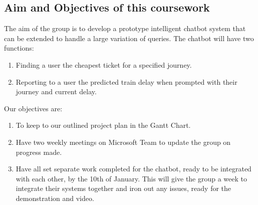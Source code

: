 \documentclass[11pt]{article}
\begin{document}
	\subsection{Aim and Objectives of this coursework} 
	The aim of the group is to develop a prototype intelligent chatbot system that can be extended to handle a large variation of queries. The chatbot will have two functions:
	\begin{enumerate}
		\item Finding a user the cheapest ticket for a specified journey.
		\item 	Reporting to a user the predicted train delay when prompted with their journey and current delay.		
	\end{enumerate}	

	Our objectives are:
	\begin{enumerate}
		\item To keep to our outlined project plan in the Gantt Chart.		
		\item Have two weekly meetings on Microsoft Team to update the group on progress made.		
		\item Have all set separate work completed for the chatbot, ready to be integrated with each other, by the 10th of January. This will give the group a week to integrate their systems together and iron out any issues, ready for the demonstration and video.
	\end{enumerate}	
	
\end{document}
